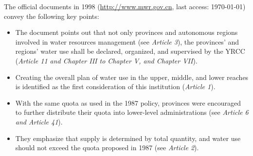 \documentclass[preprint, 12pt]{elsarticle}
\providecommand{\DIFaddbegin}{} %
\begin{document}
The official documents in 1998
(\href{http://www.mwr.gov.cn/ztpd/2013ztbd/2013fxkh/fxkhswcbcs/cs/flfg/201304/t20130411_433489.html}{http://www.mwr.gov.cn}, last access: \today) convey the following key points:

\begin{itemize}
	\item The document points out that not only provinces and autonomous regions involved in water resources management (see \textit{Article 3}), the provinces’ and regions’ water use shall be declared, organized, and supervised by the YRCC (\textit{Article 11 and Chapter III to Chapter V, and Chapter VII}).
	\item Creating the overall plan of water use in the upper, middle, and lower reaches is identified as the first consideration of this institution (\textit{Article 1}).
	\item With the same quota as used in the 1987 policy, provinces were encouraged to further distribute their quota into lower-level administrations (see \textit{Article 6 and Article 41}).
	\item They emphasize that supply is determined by total quantity, and water use should not exceed the quota proposed in 1987 (see \textit{Article 2}).
\end{itemize}

\DIFaddbegin
\end{document}

